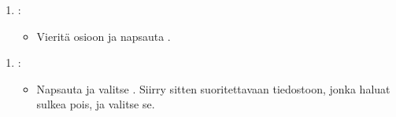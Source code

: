 \documentclass[letterpaper,10pt,finnish]{sphinxmanual}
\begin{document}
\begin{figure}[htbp]
\centering

\noindent{}
\end{figure}
\begin{enumerate}
%
\setcounter{enumi}{3}
\item {} 
\sphinxAtStartPar
{}:
\begin{itemize}
\item {} 
\sphinxAtStartPar
Vieritä \sphinxhyphen{}osioon ja napsauta .

\end{itemize}

\end{enumerate}

\begin{figure}[htbp]
\centering

\noindent{}
\end{figure}
\begin{enumerate}
%
\setcounter{enumi}{4}
\item {} 
\sphinxAtStartPar
{}:
\begin{itemize}
\item {} 
\sphinxAtStartPar
Napsauta  ja valitse . Siirry sitten suoritettavaan tiedostoon, jonka haluat sulkea pois, ja valitse se.

\end{itemize}

\end{enumerate}

\begin{figure}[htbp]
\centering

\noindent{}
\end{figure}

\begin{figure}[htbp]
\centering

\noindent{}
\end{figure}

\begin{figure}[htbp]
\centering

\noindent{}
\end{figure}
\end{document}
